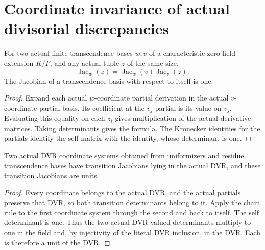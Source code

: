 \section{Coordinate invariance of actual divisorial discrepancies}

\begin{lemma}\label{lem:sc0-field-jacobian-chain-rule}
\leanok
{}
For two actual finite transcendence bases $w,v$ of a characteristic-zero
field extension $K/F$, and any actual tuple $z$ of the same size,
\[
 \operatorname{Jac}_{w}(z)=
 \operatorname{Jac}_{w}(v)\operatorname{Jac}_{v}(z).
\]
The Jacobian of a transcendence basis with respect to itself is one.
\end{lemma}
\begin{proof}
Expand each actual $w$-coordinate partial derivation in the actual
$v$-coordinate partial basis. Its coefficient at the $v_j$-partial is its
value on $v_j$. Evaluating this equality on each $z_i$ gives multiplication
of the actual derivative matrices. Taking determinants gives the formula.
The Kronecker identities for the partials identify the self matrix with
the identity, whose determinant is one.
\end{proof}

\begin{lemma}\label{lem:sc0-dvr-jacobian-transition-unit}
\leanok
{}
Two actual DVR coordinate systems obtained from uniformizers and residue
transcendence bases have transition Jacobians lying in the actual DVR, and
these transition Jacobians are units.
\end{lemma}
\begin{proof}
Every coordinate belongs to the actual DVR, and the actual partials preserve
that DVR, so both transition determinants belong to it. Apply the chain
rule to the first coordinate system through the second and back to itself.
The self determinant is one. Thus the two actual DVR-valued determinants
multiply to one in the field and, by injectivity of the literal DVR
inclusion, in the DVR. Each is therefore a unit of the DVR.
\end{proof}


